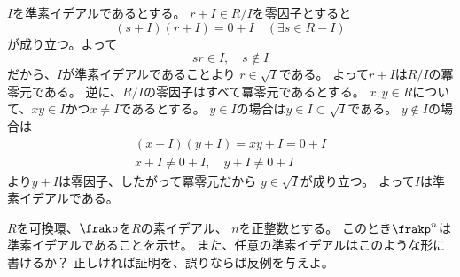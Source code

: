 \documentclass[report]{jlreq}
\begin{document}

\begin{answer}
    $I$を準素イデアルであるとする。
    $r + I \in R / I$を零因子とすると
    \begin{equation}
        (s + I)(r + I) = 0 + I \quad (\exists s \in R - I)
    \end{equation}
    が成り立つ。よって
    \begin{equation}
        sr \in I, \quad s \not\in I
    \end{equation}
    だから、$I$が準素イデアルであることより
    $r \in \sqrt{I}$である。
    よって$r + I$は$R / I$の冪零元である。
    逆に、$R / I$の零因子はすべて冪零元であるとする。
    $x, y \in R$について、$xy \in I$かつ$x \neq I$であるとする。
    $y \in I$の場合は$y \in I \subset \sqrt{I}$である。
    $y \not\in I$の場合は
    \begin{align}
        (x + I)(y + I) = xy + I = 0 + I \\
        x + I \neq 0 + I, \quad y + I \neq 0 + I
    \end{align}
    より$y + I$は零因子、したがって冪零元だから
    $y \in \sqrt{I}$が成り立つ。
    よって$I$は準素イデアルである。
\end{answer}

\begin{problem}[代数学II 5.67]
    $R$を可換環、$\frakp$を$R$の素イデアル、
    $n$を正整数とする。
    このとき$\frakp^n$は準素イデアルであることを示せ。
    また、任意の準素イデアルはこのような形に書けるか？
    正しければ証明を、誤りならば反例を与えよ。
\end{problem}
\end{document}
